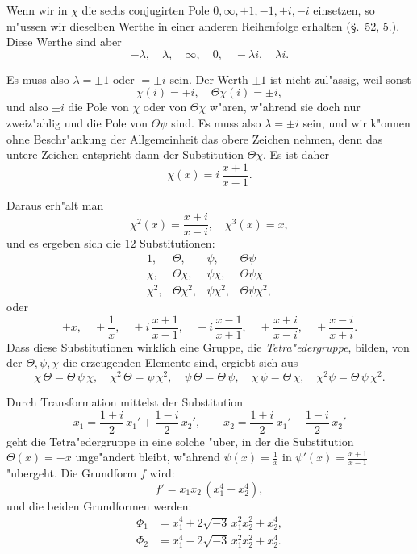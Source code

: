 \documentclass[12pt,a4paper]{article}
\theoremstyle{definition}
\begin{document}
Wenn wir in $\chi$ die sechs conjugirten Pole $0, \infty, +1, -1, +i, -i$ einsetzen, so m"ussen wir dieselben Werthe in einer anderen Reihenfolge erhalten (\S.~52, 5.). Diese Werthe sind aber
\[
-\lambda, \quad \lambda, \quad \infty, \quad 0, \quad -\lambda i, \quad \lambda i.
\]

Es muss also $\lambda = \pm 1$ oder $= \pm i$ sein. Der Werth $\pm 1$ ist nicht zul"assig, weil sonst
\[
\chi(i) = \mp i, \quad \Theta\chi(i) = \pm i,
\]
und also $\pm i$ die Pole von $\chi$ oder von $\Theta\chi$ w"aren, w"ahrend sie doch nur zweiz"ahlig und die Pole von $\Theta\psi$ sind. Es muss also $\lambda = \pm i$ sein, und wir k"onnen ohne Beschr"ankung der Allgemeinheit das obere Zeichen nehmen, denn das untere Zeichen entspricht dann der Substitution $\Theta\chi$. Es ist daher
\[
\chi(x) = i\,\frac{x + 1}{x - 1}.
\]

Daraus erh"alt man
\[
\chi^2(x) = \frac{x + i}{x - i}, \quad \chi^3(x) = x,
\]
und es ergeben sich die $12$ Substitutionen:
\begin{equation}\label{eq:56-3}
\begin{array}{cccc}
1, & \Theta, & \psi, & \Theta\psi \\
\chi, & \Theta\chi, & \psi\chi, & \Theta\psi\chi \\
\chi^2, & \Theta\chi^2, & \psi\chi^2, & \Theta\psi\chi^2,
\end{array}
\end{equation}
oder
\begin{equation}\label{eq:56-4}
\pm x, \quad \pm\frac{1}{x}, \quad \pm i\,\frac{x+1}{x-1}, \quad \pm i\,\frac{x-1}{x+1}, \quad \pm\frac{x+i}{x-i}, \quad \pm\frac{x-i}{x+i}.
\end{equation}
Dass diese Substitutionen wirklich eine Gruppe, die \emph{Tetra"edergruppe}, bilden, von der $\Theta, \psi, \chi$ die erzeugenden Elemente sind, ergiebt sich aus
\begin{equation}\label{eq:56-5}
\chi\,\Theta = \Theta\,\psi\,\chi, \quad \chi^2\,\Theta = \psi\,\chi^2, \quad \psi\,\Theta = \Theta\,\psi, \quad \chi\,\psi = \Theta\,\chi, \quad \chi^2\psi = \Theta\,\psi\,\chi^2.
\end{equation}

Durch Transformation mittelst der Substitution
\[
x_1 = \frac{1 + i}{2}\,x_1' + \frac{1 - i}{2}\,x_2', \qquad x_2 = \frac{1 + i}{2}\,x_1' - \frac{1 - i}{2}\,x_2'
\]
geht die Tetra"edergruppe in eine solche "uber, in der die Substitution $\Theta(x) = -x$ unge"andert bleibt, w"ahrend $\psi(x) = \frac{1}{x}$ in $\psi'(x) = \frac{x + 1}{x - 1}$ "ubergeht. Die Grundform $f$ wird:
\[
f' = x_1 x_2\,(x_1^4 - x_2^4),
\]
und die beiden Grundformen werden:
\begin{equation}\label{eq:56-7}
\begin{aligned}
\Phi_1 &= x_1^4 + 2\sqrt{-3}\,x_1^2 x_2^2 + x_2^4, \\
\Phi_2 &= x_1^4 - 2\sqrt{-3}\,x_1^2 x_2^2 + x_2^4.
\end{aligned}
\end{equation}
\end{document}
